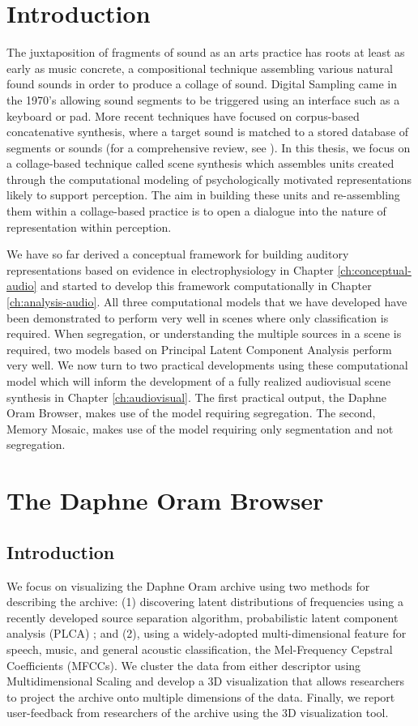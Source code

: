 \documentclass[a4paper,10pt,final]{ThesisStyle}
\begin{document}
\section{Introduction}

The juxtaposition of fragments of sound as an arts practice has roots at least as early as music concrete, a compositional technique assembling various natural found sounds in order to produce a collage of sound.  Digital Sampling came in the 1970's allowing sound segments to be triggered using an interface such as a keyboard or pad.  More recent techniques have focused on corpus-based concatenative synthesis, where a target sound is matched to a stored database of segments or sounds (for a comprehensive review, see \cite{Schwarz2006}).  In this thesis, we focus on a collage-based technique called scene synthesis which assembles units created through the computational modeling of psychologically motivated representations likely to support perception.  The aim in building these units and re-assembling them within a collage-based practice is to open a dialogue into the nature of representation within perception.  

We have so far derived a conceptual framework for building auditory representations based on evidence in electrophysiology in Chapter \ref{ch:conceptual-audio} and started to develop this framework computationally in Chapter \ref{ch:analysis-audio}.  All three computational models that we have developed have been demonstrated to perform very well in scenes where only classification is required.  When segregation, or understanding the multiple sources in a scene is required, two models based on Principal Latent Component Analysis perform very well.  We now turn to two practical developments using these computational model which will inform the development of a fully realized audiovisual scene synthesis in Chapter \ref{ch:audiovisual}.  The first practical output, the Daphne Oram Browser, makes use of the model requiring segregation.  The second, Memory Mosaic, makes use of the model requiring only segmentation and not segregation.  

\section{The Daphne Oram Browser}

\subsection{Introduction}
We focus on visualizing the Daphne Oram archive using two methods for describing the archive: (1) discovering latent distributions of frequencies using a recently developed source separation algorithm, probabilistic latent component analysis (PLCA) \cite{SmaragdisRajShashanka}; and (2), using a widely-adopted multi-dimensional feature for speech, music, and general acoustic classification, the Mel-Frequency Cepstral Coefficients (MFCCs).  We cluster the data from either descriptor using Multidimensional Scaling and develop a 3D visualization that allows researchers to project the archive onto multiple dimensions of the data.  Finally, we report user-feedback from researchers of the archive using the 3D visualization tool.  
\end{document}
